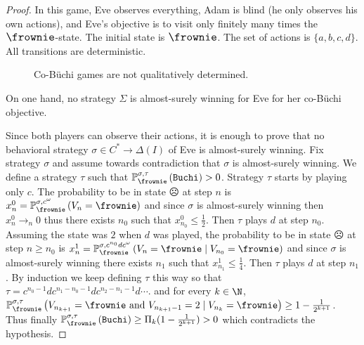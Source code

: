 \begin{proof}
In this game, Eve observes
everything, Adam is blind (he only observes his own actions),
and Eve's objective is to visit only finitely many times the ${\large \frownie}$-state. The initial state is $\large{\frownie}$. The set of actions is $\{a,b,c,d\}$.
All transitions are deterministic.%

\begin{figure}[h]
\begin{center}
\end{center}
\caption{Co-B{\"u}chi games are not qualitatively determined.}
\label{chap9fig4}
\end{figure} 


On one hand, no strategy $\Sigma$
is almost-surely winning for Eve
for her co-B{\"u}chi objective.
{
Since both players can observe their actions,
it is enough to prove that no behavioral
strategy
$\sigma\in C^*\to \Delta(I)$ of Eve is almost-surely winning.
Fix strategy $\sigma$ and assume towards contradiction that $\sigma$ is almost-surely winning. 
We define a strategy $\tau$
such that
$\probimp{\sigma,\tau}{\frownie}{ \winbuchi} > 0$.
Strategy $\tau$ starts by playing only $c$.
The probability to be in state $\frownie$ at step $n$ is
$x^{0}_n = \probimp{\sigma,c^\omega}{\frownie}{V_n=\frownie}$ and since $\sigma$ is almost-surely winning then $x^{0}_n \to_n 0$ thus there exists  $n_0$ such that 
$x^{0}_{n_0}\leq \frac{1}{2}$.
Then $\tau$ plays $d$ at step $n_0$.
Assuming the state was $2$ when $d$ was played, 
the probability to be in state $\frownie$ at step $n\geq n_0$ is
$x^{1}_n = \probimp{\sigma,c^{n_0}dc^\omega}{\frownie}{V_{n}=\frownie\mid V_{n_0}=\frownie}$
and since $\sigma$ is almost-surely winning there exists $n_1$ such that
$x^{1}_{n_1}\leq  \frac{1}{4}$.
Then $\tau$ plays $d$ at step $n_1$.
By induction we keep defining $\tau$ this way so that
$\tau=c^{n_0-1}d c^{n_1 - n_0 - 1}dc^{n_2 - n_1 - 1}d \cdots $.
and for every $k\in \N$,
$\probimp{\sigma,\tau}{\frownie}{
V_{n_{k+1}}=\frownie
\text{ and }
V_{n_{k+1}-1}=2
\mid 
V_{n_{k}}=\frownie
} \geq 1 - \frac{1}{2^{k+1}}$.
Thus finally
$\probimp{\sigma,\tau}{\frownie}{\winbuchi} \geq
\Pi_{k} (1 - \frac{1}{2^{k+1}})>0$ which contradicts the hypothesis.

}


\end{proof}
